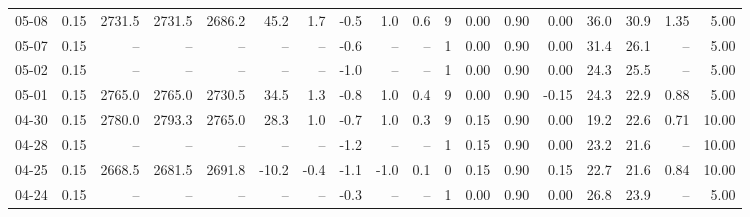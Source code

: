 \begin{threeparttable}
{\begin{tabular}{lrrrrrrrrrrrrrrrrr}
  05-08 &     0.15 & 2731.5 & 2731.5 & 2686.2 &       45.2 &            1.7 &                      -0.5 &                      1.0 &                 0.6 &              9 &       0.00 &      0.90 &           0.00 &             36.0 &                30.9 &            1.35 &                   5.00 \\
  05-07 &     0.15 &     -- &     -- &     -- &         -- &             -- &                      -0.6 &                       -- &                  -- &              1 &       0.00 &      0.90 &           0.00 &             31.4 &                26.1 &              -- &                   5.00 \\
  05-02 &     0.15 &     -- &     -- &     -- &         -- &             -- &                      -1.0 &                       -- &                  -- &              1 &       0.00 &      0.90 &           0.00 &             24.3 &                25.5 &              -- &                   5.00 \\
  05-01 &     0.15 & 2765.0 & 2765.0 & 2730.5 &       34.5 &            1.3 &                      -0.8 &                      1.0 &                 0.4 &              9 &       0.00 &      0.90 &          -0.15 &             24.3 &                22.9 &            0.88 &                   5.00 \\
  04-30 &     0.15 & 2780.0 & 2793.3 & 2765.0 &       28.3 &            1.0 &                      -0.7 &                      1.0 &                 0.3 &              9 &       0.15 &      0.90 &           0.00 &             19.2 &                22.6 &            0.71 &                  10.00 \\
  04-28 &     0.15 &     -- &     -- &     -- &         -- &             -- &                      -1.2 &                       -- &                  -- &              1 &       0.15 &      0.90 &           0.00 &             23.2 &                21.6 &              -- &                  10.00 \\
  04-25 &     0.15 & 2668.5 & 2681.5 & 2691.8 &      -10.2 &           -0.4 &                      -1.1 &                     -1.0 &                 0.1 &              0 &       0.15 &      0.90 &           0.15 &             22.7 &                21.6 &            0.84 &                  10.00 \\
  04-24 &     0.15 &     -- &     -- &     -- &         -- &             -- &                      -0.3 &                       -- &                  -- &              1 &       0.00 &      0.90 &           0.00 &             26.8 &                23.9 &              -- &                   5.00 \\

\end{tabular}}
\end{threeparttable}
